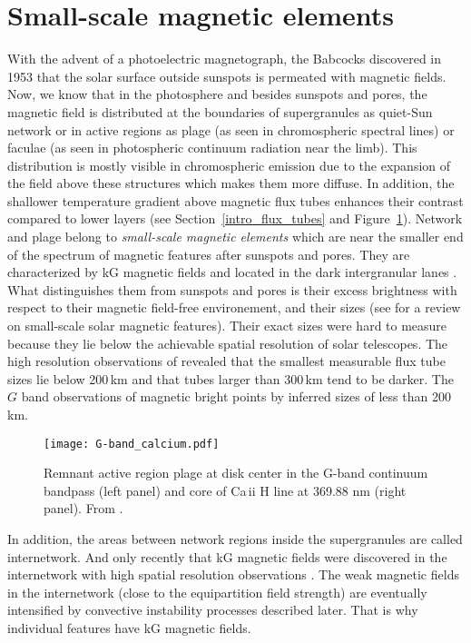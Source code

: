 \documentclass[goettingen, gauss, print]{thesis}
\begin{document}
\section{Small-scale magnetic elements}
\label{intro-ssme}
With the advent of a photoelectric magnetograph, the Babcocks discovered in 1953 that the solar surface outside sunspots is permeated with magnetic fields. 
Now, we know that in the photosphere and besides sunspots and pores, the magnetic field is distributed at the boundaries of supergranules as quiet-Sun network or in active regions as plage (as seen in chromospheric spectral lines) or faculae (as seen in photospheric continuum radiation near the limb). This distribution is mostly visible in chromospheric emission due to the expansion of the field above these structures which makes them more diffuse. In addition, the shallower temperature gradient above magnetic flux tubes enhances their contrast compared to lower layers (see Section~\ref{intro_flux_tubes} and Figure~\ref{G-band_calcium}). Network and plage belong to \textit{small-scale magnetic elements} which are near the smaller end of the spectrum of magnetic features after sunspots and pores. They are characterized by kG magnetic fields and located in the dark intergranular lanes \citep[]{stenflo_magnetic-field_1973, schussler_small-scale_1992}. What distinguishes them from sunspots and pores is their excess brightness with respect to their magnetic field-free environement, and their sizes (see \citet{solanki_small-scale_1993} for a review on small-scale solar magnetic features). Their exact sizes were hard to measure because they lie below the achievable spatial resolution of solar telescopes. The high resolution observations of \cite{keller_resolution_1992} revealed that the smallest measurable flux tube sizes lie below 200\,km and that tubes larger than 300\,km tend to be darker. The $G$ band observations of magnetic bright points by \cite{dunn_solar_1973} inferred sizes of less than 200\,km.

\begin{figure}
\centering
\hspace*{-1.3cm}\texttt{[image: G-band\_calcium.pdf]}
\caption{Remnant active region plage at disk center in the G-band continuum bandpass (left panel) and core of Ca\,{\sc ii} H line at 369.88 nm (right panel). From \cite{berger_solar_2004}.  }
\label{G-band_calcium}
\end{figure}
In addition, the areas between network regions inside the supergranules are called internetwork. And only recently that kG magnetic fields were discovered in the internetwork with high spatial resolution observations \citep[e.g.][]{lagg_fully_2010}. The weak magnetic fields in the internetwork (close to the equipartition field strength) are eventually intensified by convective instability processes described later. That is why individual features have kG magnetic fields. 
\end{document}
